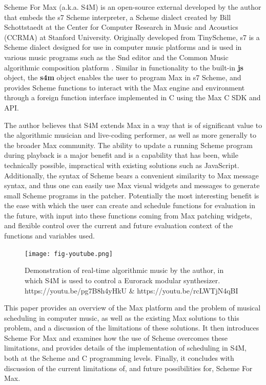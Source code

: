 \documentclass[acmsmall]{acmart}
\begin{document}
Scheme For Max (a.k.a. S4M) is an open-source external developed by the 
author that embeds the s7 Scheme interpreter, a Scheme dialect created by
Bill Schottstaedt at the  Center for Computer Research in Music and Acoustics
(CCRMA) at Stanford University. Originally developed
from TinyScheme, s7 is a Scheme dialect designed for use in computer music
platforms and is used in various music programs such as the Snd editor and the
Common Music algorithmic composition platform \cite{Schottstaedt2021}.
Similar in functionality to the built-in \textbf{js} object, 
the \textbf{s4m} object enables the user to program Max in s7 Scheme,
and provides Scheme functions to interact with the Max engine and environment through
a foreign function interface implemented in C using the Max C SDK and API.

The author believes that S4M extends Max in a way that is of significant value to 
the algorithmic musician and live-coding performer, as well as more generally 
to the broader Max community. The ability to update
a running Scheme program during playback is a major benefit
and is a capability that has been, while technically possible, impractical
with existing solutions such as JavaScript. Additionally, the syntax
of Scheme bears a convenient similarity to Max message syntax, and thus 
one can easily use Max visual widgets and messages to generate small Scheme programs in the
patcher. Potentially the most interesting benefit is the ease with which the user 
can create and schedule functions for evaluation in the future, with 
input into these functions coming from Max patching widgets, and flexible control
over the current and future evaluation context of the functions and variables used.

\begin{figure}[H]
  \centering
  \texttt{[image: fig-youtube.png]}
  \caption{Demonstration of real-time algorithmic music by the author, in which S4M is used
  to control a Eurorack modular synthesizer. https://youtu.be/pg7B8h4yHkU \& https://youtu.be/rcLWTjN4qBI  }
\end{figure}


This paper provides an overview of the Max platform and the problem of musical scheduling
in computer music, as well as the existing Max solutions to this problem, 
and a discussion of the limitations of these solutions.
It then introduces Scheme For Max and examines how the use of Scheme
overcomes these limitations, and provides details of
the implementation of scheduling in S4M, both at the Scheme and
C programming levels. Finally, it concludes with discussion of 
the current limitations of, and future possibilities for, Scheme For Max. 
\end{document}
